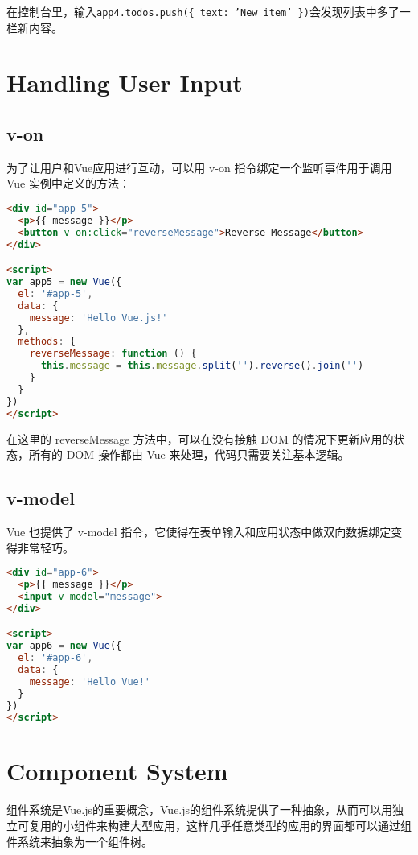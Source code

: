 在控制台里，输入\texttt{app4.todos.push(\{ text: 'New item' \})}会发现列表中多了一栏新内容。

\section{Handling User Input}


\subsection{v-on}


为了让用户和Vue应用进行互动，可以用 v-on 指令绑定一个监听事件用于调用 Vue 实例中定义的方法：

\begin{lstlisting}[language=HTML]
<div id="app-5">
  <p>{{ message }}</p>
  <button v-on:click="reverseMessage">Reverse Message</button>
</div>

<script>
var app5 = new Vue({
  el: '#app-5',
  data: {
    message: 'Hello Vue.js!'
  },
  methods: {
    reverseMessage: function () {
      this.message = this.message.split('').reverse().join('')
    }
  }
})
</script>
\end{lstlisting}

在这里的 reverseMessage 方法中，可以在没有接触 DOM 的情况下更新应用的状态，所有的 DOM 操作都由 Vue 来处理，代码只需要关注基本逻辑。


\subsection{v-model}


Vue 也提供了 v-model 指令，它使得在表单输入和应用状态中做双向数据绑定变得非常轻巧。




\begin{lstlisting}[language=HTML]
<div id="app-6">
  <p>{{ message }}</p>
  <input v-model="message">
</div>

<script>
var app6 = new Vue({
  el: '#app-6',
  data: {
    message: 'Hello Vue!'
  }
})
</script>
\end{lstlisting}


\section{Component System}


组件系统是Vue.js的重要概念，Vue.js的组件系统提供了一种抽象，从而可以用独立可复用的小组件来构建大型应用，这样几乎任意类型的应用的界面都可以通过组件系统来抽象为一个组件树。


